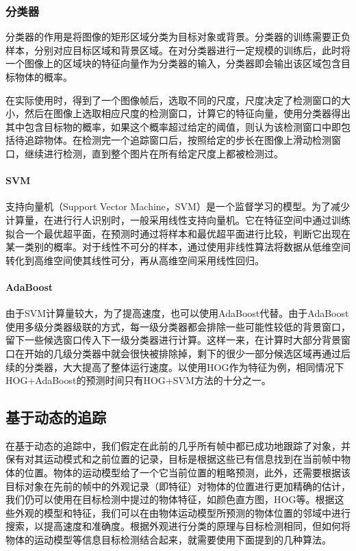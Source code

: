 \subsubsection{分类器}

  分类器的作用是将图像的矩形区域分类为目标对象或背景。分类器的训练需要正负样本，分别对应目标区域和背景区域。在对分类器进行一定规模的训练后，此时将一个图像上的区域块的特征向量作为分类器的输入，分类器即会输出该区域包含目标物体的概率。

  在实际使用时，得到了一个图像帧后，选取不同的尺度，尺度决定了检测窗口的大小，然后在图像上选取相应尺度的检测窗口，计算它的特征向量，使用分类器得出其中包含目标物的概率，如果这个概率超过给定的阈值，则认为该检测窗口中即包括待追踪物体。在检测完一个追踪窗口后，按照给定的步长在图像上滑动检测窗口，继续进行检测，直到整个图片在所有给定尺度上都被检测过。

\paragraph{SVM}

  支持向量机（Support Vector Machine，SVM）是一个监督学习的模型。为了减少计算量，在进行行人识别时，一般采用线性支持向量机。它在特征空间中通过训练拟合一个最优超平面，在预测时通过将样本和最优超平面进行比较，判断它出现在某一类别的概率。对于线性不可分的样本，通过使用非线性算法将数据从低维空间转化到高维空间使其线性可分，再从高维空间采用线性回归。

\paragraph{AdaBoost}

  由于SVM计算量较大，为了提高速度，也可以使用AdaBoost代替。由于AdaBoost使用多级分类器级联的方式，每一级分类器都会排除一些可能性较低的背景窗口，留下一些候选窗口传入下一级分类器进行计算。这样一来，在计算时大部分背景窗口在开始的几级分类器中就会很快被排除掉，剩下的很少一部分候选区域再通过后续的分类器，大大提高了整体运行速度。以使用HOG作为特征为例，相同情况下HOG+AdaBoost的预测时间只有HOG+SVM方法的十分之一。

\subsection{基于动态的追踪}

  在基于动态的追踪中，我们假定在此前的几乎所有帧中都已成功地跟踪了对象，并保有对其运动模式和之前位置的记录，目标是根据这些已有信息找到在当前帧中物体的位置。物体的运动模型给了一个它当前位置的粗略预测，此外，还需要根据该目标对象在先前的帧中的外观记录（即特征）对物体的位置进行更加精确的估计，我们仍可以使用在目标检测中提过的物体特征，如颜色直方图，HOG等。根据这些外观的模型和特征，我们可以在由物体运动模型所预测的物体位置的邻域中进行搜索，以提高速度和准确度。根据外观进行分类的原理与目标检测相同，但如何将物体的运动模型等信息目标检测结合起来，就需要使用下面提到的几种算法。

